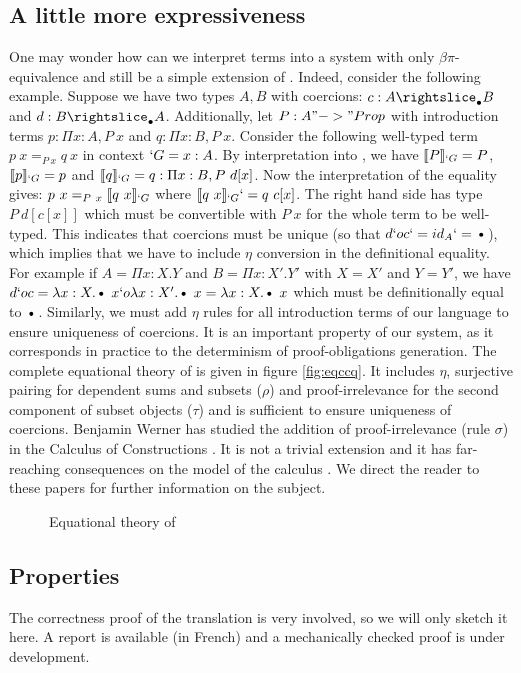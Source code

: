 \documentclass{llncs}
\begin{document}
\subsection{A little more expressiveness}
One may wonder how can we interpret \Russell terms into a system with only
$\beta\pi$-equivalence and still be a simple extension of \CIC. 
Indeed, consider the following example. Suppose we have two types $A, B$
with coercions: $c : A \suba B$ and $d : B \suba A$. Additionally, let
$P : A "->" Prop$ with introduction terms $p : \Pi x : A, P~x$ and $q :
\Pi x : B, P~x$. Consider the following well-typed \Russell term $p~x
=_{P~x} q~x$ in context $`G = x : A$. By interpretation into \CIC, we
have $\llbracket P \rrbracket_{`G} = P$, $\llbracket p \rrbracket_{`G} = p$ and $\llbracket q \rrbracket_{`G} = q : \Pi x : B,
P~d[x]$. Now the interpretation of the equality gives:
$p~x =_{P~x} \llbracket q~x \rrbracket_{`G}$ where $\llbracket q~x \rrbracket_{`G} `= q~c[x]$. 
The right hand side has type $P~d[c[x]]$ which must be
convertible with $P~x$ for the whole term to be well-typed. This
indicates that coercions must be unique (so that $d `o c `= id_A `=
\ctxdot$), which implies that we have to include $\eta$ 
conversion in the definitional equality. For
example if $A = \Pi x : X.Y$ and $B = \Pi x : X'.Y'$ with $X = X'$ and
$Y = Y'$, we have $d `o c = \lambda x : X. \ctxdot~x `o \lambda x
: X'. \ctxdot~x = \lambda x : X. \ctxdot~x$ which must be definitionally
equal to $\ctxdot$.
Similarly, we must add $\eta$ rules for all introduction terms of our
language to ensure uniqueness of coercions. It is an important
property of our system, as it corresponds in practice to the determinism
of proof-obligations
generation. The complete equational theory of \CICq{} is given in figure
\vref{fig:eqccq}. It includes $\eta$, surjective pairing for dependent
sums and subsets ($\rho$) and proof-irrelevance for the second component
of subset objects ($\tau$) and is sufficient to ensure uniqueness of coercions.
Benjamin Werner has studied the addition of proof-irrelevance (rule
$\sigma$) in the Calculus of Constructions
\cite{Werner:ProofIrrelevance}. It is not a trivial extension and it has
far-reaching consequences on the model of the calculus
\cite{DBLP:conf/types/MiquelW02}. We direct the reader to these papers for further
information on the subject.
\begin{figure}[ht]  
  \ccqeqarr 
  \caption{Equational theory of \CICq}
  \label{fig:eqccq}  
\end{figure}

\subsection{Properties}
The correctness proof of the translation is very involved, so we will
only sketch it here. A report \cite{sozeau:Coq/Russell/report} is
available (in French) and a mechanically checked proof is under development.
\end{document}
